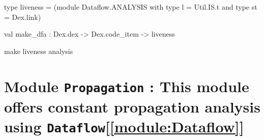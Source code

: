 \documentclass[11pt]{article}
\begin{document}
\ocamldocvspace{0.5cm}



\label{type:Liveness.liveness}\begin{ocamldoccode}
type liveness = (module Dataflow.ANALYSIS with type l = Util.IS.t and type st = Dex.link) 
\end{ocamldoccode}




\label{val:Liveness.make-underscoredfa}\begin{ocamldoccode}
val make_dfa : Dex.dex -> Dex.code_item -> liveness
\end{ocamldoccode}
\begin{ocamldocdescription}
make liveness analysis


\end{ocamldocdescription}


\section{Module {\tt{Propagation}} : This module offers constant propagation analysis using {\tt{Dataflow}}[\ref{module:Dataflow}]}
\label{module:Propagation}




\ocamldocvspace{0.5cm}
\end{document}
